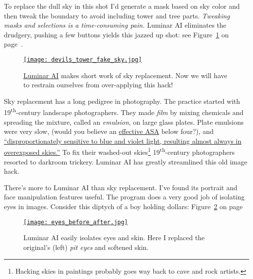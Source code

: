 To replace the dull sky in this shot I'd generate a mask based on sky
color and then tweak the boundary to avoid including tower and tree
parts. \emph{Tweaking masks and selections is a time-consuming pain.}
Luminar AI eliminates the drudgery, pushing a few buttons yields this jazzed up shot: see Figure~\ref{fig:7048X2} on page~\pageref{fig:7048X2}.


\begin{figure}[htbp]
\centering
\href{https://conceptcontrol.smugmug.com/Themes/Manipulations/Fake-Pixels/i-jft2zQ3/A}{\texttt{[image: devils\_tower\_fake\_sky.jpg]}}
\caption{\href{https://skylum.com/luminar-ai-b}{Luminar AI} makes short work of sky replacement. Now we
will have to restrain ourselves from over-applying this hack!} 
\label{fig:7048X2}
\end{figure}

Sky replacement has a long pedigree in photography. The practice started
with 19\textsuperscript{th}-century landscape photographers. They made
\emph{film} by mixing chemicals and spreading the mixture, called an
\emph{emulsion}, on large glass plates. Plate emulsions were very slow,
(would you believe an
\href{https://en.wikipedia.org/wiki/Film_speed}{effective ASA} below
four?), and
\href{https://www.nytimes.com/2012/10/12/arts/design/faking-it-at-the-met-a-photography-exhibition.html}{``disproportionately
sensitive to blue and violet light, resulting almost always in
overexposed skies.''} To fix their washed-out
skies\footnote{Hacking skies in paintings probably 
goes way back to cave and rock artists.
} 19\textsuperscript{th}-century photographers resorted to darkroom
trickery. Luminar AI has greatly streamlined this old image hack.

There's more to Luminar AI than sky replacement. I've found its portrait
and face manipulation features useful. The program does a very good job
of isolating eyes in images. Consider this diptych of a boy holding
dollars: Figure~\ref{fig:7048X3} on page~\pageref{fig:7048X3}


\begin{figure}[htbp]
\centering
\href{https://bakerjd99.files.wordpress.com/2021/01/eyes_before_after.jpg}{\texttt{[image: eyes\_before\_after.jpg]}}
\caption{Luminar AI easily isolates eyes and skin. Here I 
replaced the original's (left)  \emph{pit eyes} and softened skin.} 
\label{fig:7048X3}
\end{figure}

